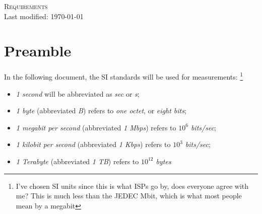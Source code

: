 \documentclass[10pt,a4paper]{report}
\begin{document}
    \begin{center}
        {\LARGE \textsc{Requirements}}\\
        Last modified: \today
    \end{center}
    \section*{Preamble}
        In the following document, the SI standards will be used for measurements:
        \footnote{I've chosen SI units since this is what ISPs go by, does everyone agree with me? This is much less than the JEDEC Mbit, which is what most people mean by a megabit}
        \begin{itemize}
            \item \emph{1 second} will be abbreviated as \emph{sec} or \emph{s};
            
            \item \emph{1 byte} (abbreviated \emph{B}) refers to \emph{one octet}, or \emph{eight bits};
            
            \item \emph{1 megabit per second} (abbreviated \emph{1 Mbps}) refers to \emph{$10^6$ bits/sec};
            
            \item \emph{1 kilobit per second} (abbreviated \emph{1 Kbps}) refers to \emph{$10^3$ bits/sec};
            
            \item \emph{1 Terabyte} (abbreviated \emph{1 TB}) refers to \emph{$10^{12}$ bytes}
        \end{itemize}
\end{document}
